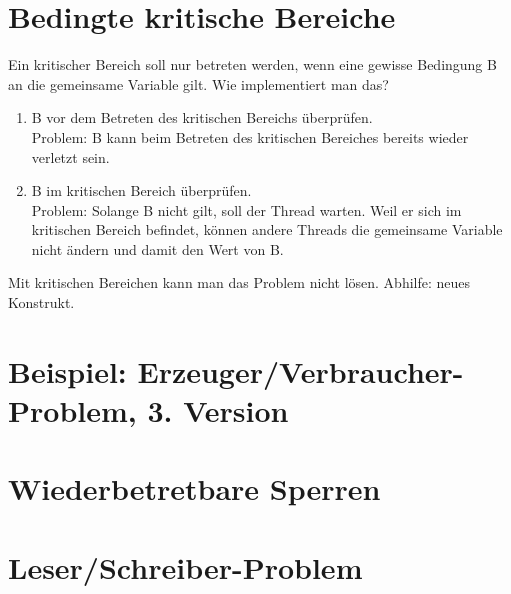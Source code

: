\section{Bedingte kritische Bereiche}
Ein kritischer Bereich soll nur betreten werden, wenn eine gewisse Bedingung B an die gemeinsame Variable gilt. Wie implementiert man das?
\begin{enumerate}
\item B vor dem Betreten des kritischen Bereichs überprüfen.\\Problem: B kann beim Betreten des kritischen Bereiches bereits wieder verletzt sein.
\item B im kritischen Bereich überprüfen.\\Problem: Solange B nicht gilt, soll der Thread warten. Weil er sich im kritischen Bereich befindet, können andere Threads die gemeinsame Variable nicht ändern und damit den Wert von B.
\end{enumerate}
Mit kritischen Bereichen kann man das Problem nicht lösen. Abhilfe: neues Konstrukt.

\section[Beispiel: Erzeuger/Verbraucher (3)]{Beispiel: Erzeuger/Verbraucher-Problem, 3. Version}

\section{Wiederbetretbare Sperren}

\section{Leser/Schreiber-Problem}